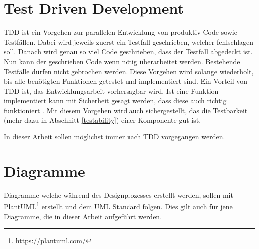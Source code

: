 \section{Test Driven Development} \label{tdd}
\ac{TDD} ist ein Vorgehen zur parallelen Entwicklung von produktiv Code sowie Testfällen.
Dabei wird jeweils zuerst ein Testfall geschrieben, welcher fehlschlagen soll.
Danach wird genau so viel Code geschrieben, dass der Testfall abgedeckt ist.
Nun kann der geschrieben Code wenn nötig überarbeitet werden.
Bestehende Testfälle dürfen nicht gebrochen werden.
Diese Vorgehen wird solange wiederholt, bis alle benötigten Funktionen getestet und implementiert sind.
Ein Vorteil von \ac{TDD} ist, das Entwicklungsarbeit vorhersagbar wird.
Ist eine Funktion implementiert kann mit Sicherheit gesagt werden, dass diese auch richtig funktioniert \parencite{beck2003test}.
Mit diesem Vorgehen wird auch sichergestellt, das die Testbarkeit (mehr dazu in Abschnitt \ref{testability}) einer Komponente gut ist.

In dieser Arbeit sollen möglichst immer nach \ac{TDD} vorgegangen werden.


\section{Diagramme}
Diagramme welche während des Designprozesses erstellt werden, sollen mit PlantUML\footnote{https://plantuml.com/} erstellt und dem UML Standard folgen.
Dies gilt auch für jene Diagramme, die in dieser Arbeit aufgeführt werden.